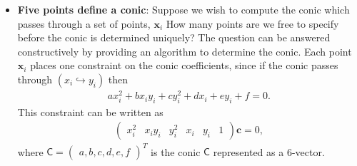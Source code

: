 \documentclass{report}
\begin{document}
\begin{itemize}
\begin{align*}
                ax_{1}{}^{2}+bx_{1}x_{2}+cx_{2}{}^{2}+dx_{1}x_{3}+ex_{2}x_{3}+fx_{3}{}^{2}=0
            \end{align*}
            or in matrix form
            \begin{align*}
                \mathbf{x}^{\mathsf{\top}}\mathsf{C}\mathbf{x} = 0
            \end{align*}
            where the conic coefficient matrix $\mathsf{C}$ is given by 
            \begin{align*}
                \mathsf{C} = \begin{pmatrix} a & \frac{b}{2} & \frac{d}{2} \\ \frac{b}{2} & c & \frac{e}{2} \\ \frac{d}{2} & \frac{e}{2} & f \end{pmatrix}
            .\end{align*}
            Note that the conic coefficient matrix is symmetric. As in the case of the homogeneous representation of points and lines, only the ratios of the matrix elements are important, since multiplying $\mathsf{C}$ by a non-zero scalar does not affect the above equations. Thus $\mathsf{C}$ is a homogeneous representation of a conic. The conic has five degrees of freedom which can be thought of as the ratios $\{a:b:c:d:e:f\}$ or equivalently the six elements of a symmetric matrix less one for scale.
        \item \textbf{Five points define a conic}: Suppose we wish to compute the conic which passes through a set of points, $\mathbf{x}_{i}$ How many points are we free to specify before the conic is determined uniquely? The question can be answered constructively by providing an algorithm to determine the conic. Each point $\mathbf{x}_{i}$ places one constraint on the conic coefficients, since if the conic passes through $(x_{i}\hookrightarrow y_{i})$ then
            \begin{align*}
                ax_{i}^{2} + bx_{i}y_{i} + cy_{i}^{2} + dx_{i} + ey_{i} + f =0
            .\end{align*}
            This constraint can be written as
            \begin{align*}
                \begin{pmatrix} x_{i}^{2} & x_{i}y_{i} & y_{i}^{2} & x_{i} & y_{i} & 1 \end{pmatrix}\mathbf{c} = 0
            ,\end{align*}
            where $\mathsf{C} = \begin{pmatrix} a,b,c,d,e,f \end{pmatrix}^{T} $ is the conic $\mathsf{C}$ represented as a 6-vector.

\end{itemize}
\end{document}
